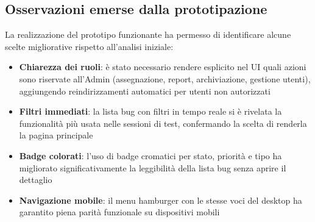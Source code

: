 \subsection{Osservazioni emerse dalla prototipazione}

La realizzazione del prototipo funzionante ha permesso di identificare alcune scelte migliorative rispetto all'analisi iniziale:

\begin{itemize}
    \item \textbf{Chiarezza dei ruoli}: è stato necessario rendere esplicito nel UI quali azioni sono riservate all'Admin (assegnazione, report, archiviazione, gestione utenti), aggiungendo reindirizzamenti automatici per utenti non autorizzati
    \item \textbf{Filtri immediati}: la lista bug con filtri in tempo reale si è rivelata la funzionalità più usata nelle sessioni di test, confermando la scelta di renderla la pagina principale
    \item \textbf{Badge colorati}: l'uso di badge cromatici per stato, priorità e tipo ha migliorato significativamente la leggibilità della lista bug senza aprire il dettaglio
    \item \textbf{Navigazione mobile}: il menu hamburger con le stesse voci del desktop ha garantito piena parità funzionale su dispositivi mobili
\end{itemize}
